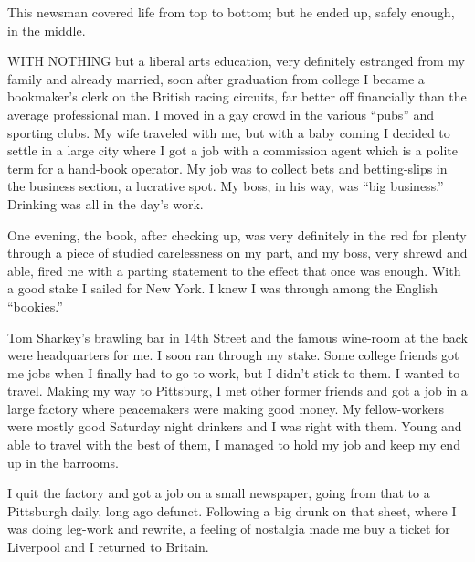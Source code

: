 

\bbChapterPreamble




\begin{biblechapter}
    This newsman covered life from top to bottom; 
    but he ended up, safely enough, in the middle.
\end{biblechapter}


\begin{biblechapter}
    WITH NOTHING but a liberal arts education, 
    very definitely estranged from my family and already married, 
    soon after graduation from college 
    I became a bookmaker’s clerk on the British racing circuits, 
    far better off financially than the average professional man.
\verse I moved in a gay crowd in the various “pubs” and sporting clubs.
\verse My wife traveled with me, 
    but with a baby coming I decided to settle 
    in a large city where I got a job with a commission agent 
    which is a polite term for a hand-book operator.
\verse My job was to collect bets and betting-slips 
    in the business section, 
    a lucrative spot.
\verse My boss, in his way, was “big business.”
\verse Drinking was all in the day’s work.

\verse One evening, the book, after checking up, was very definitely in the red for plenty through a piece of studied carelessness on my part, and my boss, very shrewd and able, fired me with a parting statement to the effect that once was enough. With a good stake I sailed for New York. I knew I was through among the English “bookies.”

Tom Sharkey’s brawling bar in 14th Street and the famous wine-room at the back were headquarters for me. I soon ran through my stake. Some college friends got me jobs when I finally had to go to work, but I didn’t stick to them. I wanted to travel. Making my way to Pittsburg, I met other former friends and got a job in a large factory where peacemakers were making good money. My fellow-workers were mostly good Saturday night drinkers and I was right with them. Young and able to travel with the best of them, I managed to hold my job and keep my end up in the barrooms.

I quit the factory and got a job on a small newspaper, going from that to a Pittsburgh daily, long ago defunct. Following a big drunk on that sheet, where I was doing leg-work and rewrite, a feeling of nostalgia made me buy a ticket for Liverpool and I returned to Britain.


\end{biblechapter}

